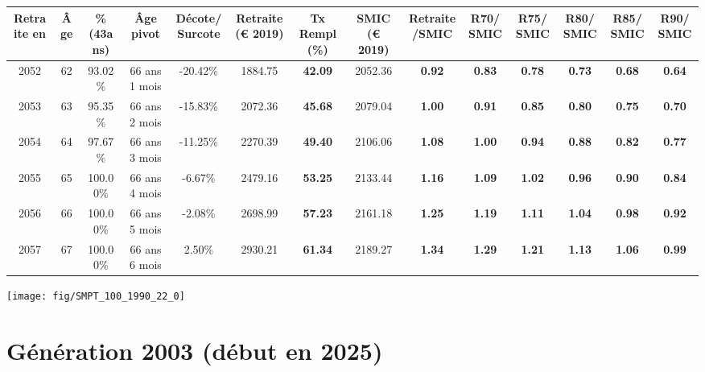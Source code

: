 \begin{adjustbox}{max width=\textwidth} 
\begin{tabular}[htb]{|c|c||c|c|c||c|c||c|c||c|c|c|c|c|} 
\hline 
 Retraite en &  Âge &  \%(43ans) &  Âge pivot &  Décote/Surcote &  Retraite (\euro{} 2019) &  Tx Rempl(\%) &  SMIC (\euro{} 2019) &  Retraite/SMIC &  R70/SMIC &  R75/SMIC &  R80/SMIC &  R85/SMIC &  R90/SMIC \\ 
\hline \hline 
 2052 &  62 &  93.02\% &  66 ans 1 mois &  -20.42\% &  1884.75 &  {\bf 42.09} &  2052.36 &  {\bf {\color{red} 0.92}} &  {\bf {\color{red} 0.83}} &  {\bf {\color{red} 0.78}} &  {\bf {\color{red} 0.73}} &  {\bf {\color{red} 0.68}} &  {\bf {\color{red} 0.64}} \\ 
\hline 
 2053 &  63 &  95.35\% &  66 ans 2 mois &  -15.83\% &  2072.36 &  {\bf 45.68} &  2079.04 &  {\bf {\color{red} 1.00}} &  {\bf {\color{red} 0.91}} &  {\bf {\color{red} 0.85}} &  {\bf {\color{red} 0.80}} &  {\bf {\color{red} 0.75}} &  {\bf {\color{red} 0.70}} \\ 
\hline 
 2054 &  64 &  97.67\% &  66 ans 3 mois &  -11.25\% &  2270.39 &  {\bf 49.40} &  2106.06 &  {\bf 1.08} &  {\bf {\color{red} 1.00}} &  {\bf {\color{red} 0.94}} &  {\bf {\color{red} 0.88}} &  {\bf {\color{red} 0.82}} &  {\bf {\color{red} 0.77}} \\ 
\hline 
 2055 &  65 &  100.00\% &  66 ans 4 mois &  -6.67\% &  2479.16 &  {\bf 53.25} &  2133.44 &  {\bf 1.16} &  {\bf 1.09} &  {\bf 1.02} &  {\bf {\color{red} 0.96}} &  {\bf {\color{red} 0.90}} &  {\bf {\color{red} 0.84}} \\ 
\hline 
 2056 &  66 &  100.00\% &  66 ans 5 mois &  -2.08\% &  2698.99 &  {\bf 57.23} &  2161.18 &  {\bf 1.25} &  {\bf 1.19} &  {\bf 1.11} &  {\bf 1.04} &  {\bf {\color{red} 0.98}} &  {\bf {\color{red} 0.92}} \\ 
\hline 
 2057 &  67 &  100.00\% &  66 ans 6 mois &  2.50\% &  2930.21 &  {\bf 61.34} &  2189.27 &  {\bf 1.34} &  {\bf 1.29} &  {\bf 1.21} &  {\bf 1.13} &  {\bf 1.06} &  {\bf {\color{red} 0.99}} \\ 
\hline 
\hline 
\end{tabular} 
\end{adjustbox} 
 
 \vspace{0.1cm} 

 {\hspace{-2.2cm}\texttt{[image: fig/SMPT\_100\_1990\_22\_0]}} 

\newpage 
 
\section{Génération 2003 (début en 2025)\label{SMPT_100_2003_22_0}} 
 
